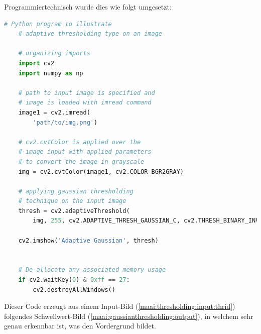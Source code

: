 Programmiertechnisch wurde dies wie folgt umgesetzt:


\begin{lstlisting}[caption=Adaptive Gaussian Thresholding,language=Python,label=maai:gaussianthresholding]
    # Python program to illustrate
    # adaptive thresholding type on an image
    
    # organizing imports
    import cv2
    import numpy as np
    
    # path to input image is specified and
    # image is loaded with imread command
    image1 = cv2.imread(
        'path/to/img.png')
    
    # cv2.cvtColor is applied over the
    # image input with applied parameters
    # to convert the image in grayscale
    img = cv2.cvtColor(image1, cv2.COLOR_BGR2GRAY)
    
    # applying gaussian thresholding
    # technique on the input image
    thresh = cv2.adaptiveThreshold(
        img, 255, cv2.ADAPTIVE_THRESH_GAUSSIAN_C, cv2.THRESH_BINARY_INV, 5, 4)
    
    cv2.imshow('Adaptive Gaussian', thresh)
    
    
    # De-allocate any associated memory usage
    if cv2.waitKey(0) & 0xff == 27:
        cv2.destroyAllWindows()
\end{lstlisting}

Dieser Code erzeugt aus einem Input-Bild (\ref{maai:thresholding:input:thrid}) folgendes Schwellwert-Bild (\ref{maai:gaussianthresholding:output}), in welchem sehr genau erkennbar ist, was den Vordergrund bildet.


